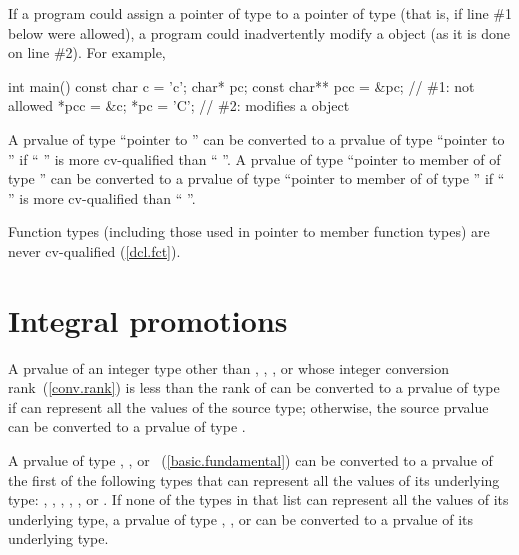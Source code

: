 \begin{note}
If a program could assign a pointer of type  to a pointer of
type   (that is, if line \#1 below were
allowed), a program could inadvertently modify a  object
(as it is done on line \#2). For example,

\begin{codeblock}
int main() {
  const char c = 'c';
  char* pc;
  const char** pcc = &pc;       // \#1: not allowed
  *pcc = &c;
  *pc = 'C';                    // \#2: modifies a  object
}
\end{codeblock}
\end{note}

\pnum
\begin{note}
A prvalue of type ``pointer to  '' can be
converted to a prvalue of type ``pointer to  '' if
`` '' is more cv-qualified than ``
''.
A prvalue of type ``pointer to member of  of type 
'' can be converted to a prvalue of type ``pointer to member
of  of type  '' if ``
'' is more cv-qualified than `` ''.
\end{note}

\pnum
\begin{note}
Function types (including those used in pointer to member function
types) are never cv-qualified (\ref{dcl.fct}).
\end{note}

\section[conv.prom]{Integral promotions}

\pnum
{}%
A prvalue of an integer type other than , ,
, or  whose integer conversion
rank~(\ref{conv.rank}) is less than the rank of  can be
converted to a prvalue of type  if  can represent
all the values of the source type; otherwise, the source prvalue can be
converted to a prvalue of type .

\pnum
{}%
%
%
A prvalue of type , , or
~(\ref{basic.fundamental}) can be converted to a prvalue
of the first of the following types that can represent all the values of
its underlying type: , , ,
, ,
or . If none of the types in that list can
represent all the values of its underlying type, a prvalue of type
, , or  can be converted
to a prvalue of its underlying type.

